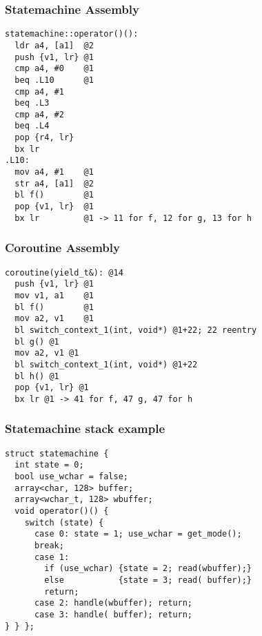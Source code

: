 \documentclass{beamer}
\begin{document}
\begin{frame}[fragile]
\frametitle{Statemachine Assembly}
\vspace*{-3ex}
\begin{block}{\vspace*{-3.2ex}}
\begin{lstlisting}[language=ASM, basicstyle=\small]
statemachine::operator()():
  ldr a4, [a1]  @2
  push {v1, lr} @1
  cmp a4, #0    @1
  beq .L10      @1 
  cmp a4, #1
  beq .L3
  cmp a4, #2
  beq .L4
  pop {r4, lr}
  bx lr
.L10:
  mov a4, #1    @1
  str a4, [a1]  @2
  bl f()        @1
  pop {v1, lr}  @1
  bx lr         @1 -> 11 for f, 12 for g, 13 for h
\end{lstlisting}
\end{block}
\end{frame}

\begin{frame}[fragile]
\frametitle{Coroutine Assembly}
\begin{block}{\vspace*{-3.2ex}}
\begin{lstlisting}[language=ASM, basicstyle=\small]
coroutine(yield_t&): @14
  push {v1, lr} @1
  mov v1, a1	@1  
  bl f()        @1
  mov a2, v1    @1
  bl switch_context_1(int, void*) @1+22; 22 reentry
  bl g() @1
  mov a2, v1 @1
  bl switch_context_1(int, void*) @1+22
  bl h() @1
  pop {v1, lr} @1
  bx lr @1 -> 41 for f, 47 g, 47 for h
\end{lstlisting}
\end{block}
\end{frame}

\begin{frame}[fragile]
\frametitle{Statemachine stack example}
\vspace*{-3ex}

\begin{block}{\vspace*{-3.2ex}}
\begin{lstlisting}[basicstyle=\small]
struct statemachine {
  int state = 0;
  bool use_wchar = false;
  array<char, 128> buffer;
  array<wchar_t, 128> wbuffer;
  void operator()() {
    switch (state) {
      case 0: state = 1; use_wchar = get_mode(); 
      break;
      case 1: 
        if (use_wchar) {state = 2; read(wbuffer);}
        else           {state = 3; read( buffer);}
        return;
      case 2: handle(wbuffer); return; 
      case 3: handle( buffer); return;
} } };
\end{lstlisting}
\end{block}
\end{frame}
\end{document}
